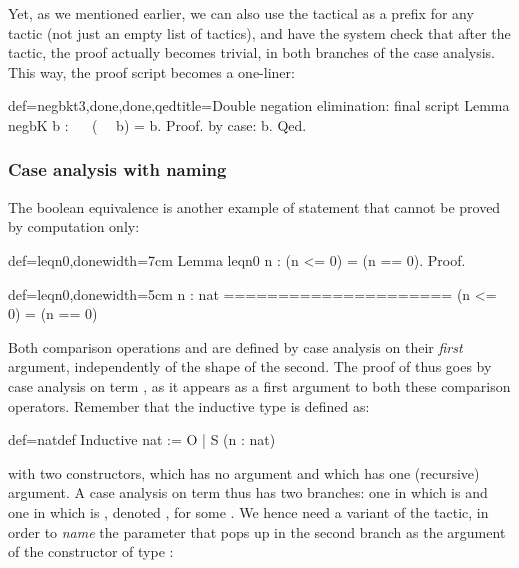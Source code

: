 Yet, as we mentioned earlier, we can also use the  tactical as a
prefix for any tactic (not just an empty list of tactics),
and have the system check that after the
 tactic, the proof actually becomes trivial, in both branches
of the case analysis. This way, the proof script becomes a one-liner:

\begin{coq}{def=negbkt3,done,done,qed}{title=Double negation elimination: final script}
Lemma negbK b : ~~ (~~ b) = b.
Proof. by case: b. Qed.
\end{coq}

\subsubsection{Case analysis with naming}

The boolean equivalence  is another example of statement that
cannot be proved by computation only:

\begin{coq}{def=leqn0,done}{width=7cm}
Lemma leqn0 n : (n <= 0) = (n == 0).
Proof.
\end{coq}
\begin{coqout}{def=leqn0,done}{width=5cm}
n : nat
=====================
  (n <= 0) = (n == 0)
\end{coqout}

Both comparison operations \C{<=} and \C{==} are defined by case
analysis on their \emph{first} argument, independently of the shape of
the second. The proof of  thus goes by case analysis on
 term , as it appears as a first argument to
both these comparison operators.  Remember that the inductive type  is
defined as:

\begin{coq}{def=natdef}{}
Inductive nat := O | S (n : nat)
\end{coq}
with two constructors,  which has no argument and  which has
one (recursive) argument. A case analysis on term  thus
has two branches: one in which  is  and one in which  is
, denoted , for some . We hence need a
variant of the  tactic, in order to \emph{name} the parameter
 that pops up in the second branch as the argument of the 
constructor of type :

